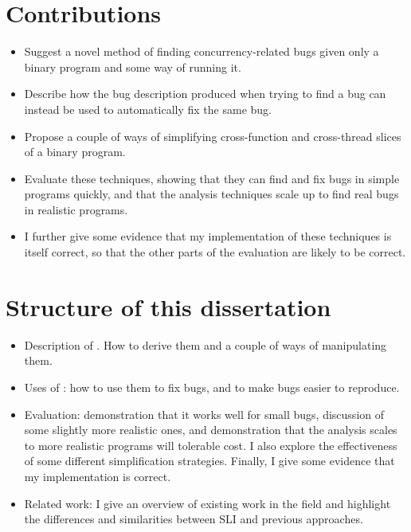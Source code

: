 
\section{Contributions}

\begin{itemize}
\item
  Suggest a novel method of finding concurrency-related bugs given
  only a binary program and some way of running it.
\item
  Describe how the bug description produced when trying to find a bug
  can instead be used to automatically fix the same bug.
\item
  Propose a couple of ways of simplifying cross-function and
  cross-thread slices of a binary program.
\item
  Evaluate these techniques, showing that they can find and fix bugs
  in simple programs quickly, and that the analysis techniques
   scale up to find real bugs in realistic
  programs.
\item
  I further give some evidence that my implementation of these
  techniques is itself correct, so that the other parts of the
  evaluation are likely to be correct.
\end{itemize}


\section{Structure of this dissertation}

\begin{itemize}
\item Description of \StateMachines.  How to derive them and a couple
  of ways of manipulating them.
\item Uses of \StateMachines: how to use them to fix bugs, and to make
  bugs easier to reproduce.
\item Evaluation: demonstration that it works well for small bugs,
  discussion of some slightly more realistic ones, and demonstration
  that the analysis scales to more realistic programs will tolerable
  cost.  I also explore the effectiveness of some different
  \StateMachine simplification strategies.  Finally, I give some
  evidence that my implementation is correct.
\item Related work: I give an overview of existing work in the field
  and highlight the differences and similarities between SLI and
  previous approaches.
\end{itemize}

